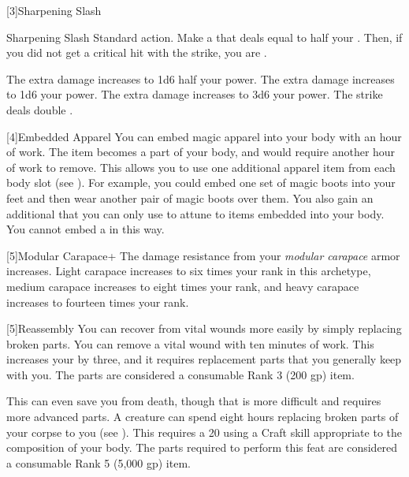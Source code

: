     [3]{Sharpening Slash}
    \begin{activeability}{Sharpening Slash}
        \abilityusagetime Standard action.
        \rankline
        Make a  that deals  equal to half your .
        Then, if you did not get a critical hit with the strike, you are  \honed.

        \rankline
         The extra damage increases to 1d6 \add half your power.
         The extra damage increases to 1d6 \add your power.
         The extra damage increases to 3d6 \add your power.
         The strike deals double .
    \end{activeability}

    [4]{Embedded Apparel} You can embed magic apparel into your body with an hour of work.
      The item becomes a part of your body, and would require another hour of work to remove.
      This allows you to use one additional apparel item from each body slot (see ).
      For example, you could embed one set of magic boots into your feet and then wear another pair of magic boots over them.
      You also gain an additional  that you can only use to attune to items embedded into your body.
      You cannot embed a  in this way.

    [5]{Modular Carapace+} The damage resistance from your \textit{modular carapace} armor increases.
      Light carapace increases to six times your rank in this archetype, medium carapace increases to eight times your rank, and heavy carapace increases to fourteen times your rank.

    [5]{Reassembly} You can recover from vital wounds more easily by simply replacing broken parts.
      You can remove a vital wound with ten minutes of work.
      This increases your  by three, and it requires replacement parts that you generally keep with you.
      The parts are considered a consumable Rank 3 (200 gp) item.

      This can even save you from death, though that is more difficult and requires more advanced parts.
      A creature can spend eight hours replacing broken parts of your corpse to  you (see ).
      This requires a  20  using a Craft skill appropriate to the composition of your body.
      The parts required to perform this feat are considered a consumable Rank 5 (5,000 gp) item.

